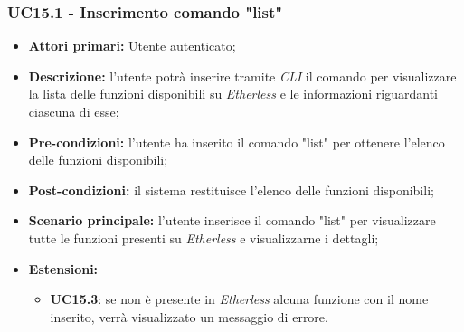 \subsubsection{UC15.1 - Inserimento comando "list"}
\begin{itemize}
	\item \textbf{Attori primari:} Utente autenticato;
	\item \textbf{Descrizione:} l'utente potrà inserire tramite \textit{CLI\glo} il comando per visualizzare la lista delle funzioni disponibili su \textit{Etherless} e le informazioni riguardanti ciascuna di esse;
	\item \textbf{Pre-condizioni:} l'utente ha inserito il comando "list" per ottenere l'elenco delle funzioni disponibili;
	\item \textbf{Post-condizioni:} il sistema restituisce l'elenco delle funzioni disponibili;
	\item \textbf{Scenario principale:} l'utente inserisce il comando "list" per visualizzare tutte le funzioni presenti su \textit{Etherless} e visualizzarne i dettagli;
	\item \textbf{Estensioni:}
	\begin{itemize}
		\item \textbf{UC15.3}: se non è presente in \textit{Etherless} alcuna funzione con il nome inserito, verrà visualizzato un messaggio di errore.
	\end{itemize}
\end{itemize}